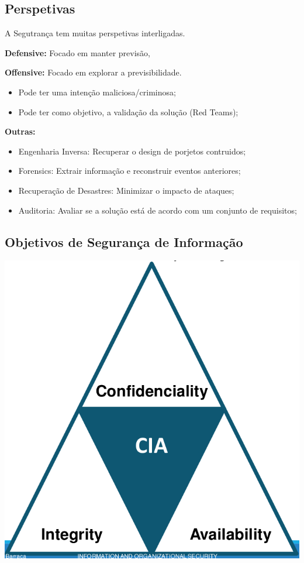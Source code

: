 \documentclass{article}
\begin{document}
\subsection{Perspetivas}

A Segutrança tem muitas perspetivas interligadas.

\begin{flushleft}
  \textbf{Defensive:} Focado em manter previsão,

  \textbf{Offensive:} Focado em explorar a previsibilidade.
  \begin{itemize}
    \item Pode ter uma intenção maliciosa/criminosa;
    \item Pode ter como objetivo, a validação da solução (Red Teams);
  \end{itemize}

  \pagebreak

  \textbf{Outras:}
  \begin{itemize}
    \item Engenharia Inversa: Recuperar o design de porjetos contruidos;
    \item Forensics: Extrair informação e reconstruir eventos anteriores;
    \item Recuperação de Desastres: Minimizar o impacto de ataques;
    \item Auditoria: Avaliar se a solução está de acordo com um conjunto de requisitos;
  \end{itemize}
\end{flushleft}

\subsection{Objetivos de Segurança de Informação}

\begin{center}
  \includegraphics[scale=0.2]{3}
\end{center}
\end{document}
